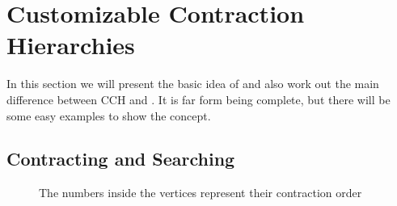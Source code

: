 \chapter{Customizable Contraction Hierarchies}\label{sec:Preliminary_CCH}

In this section we will present the basic idea of \cite[Customization Contraction Hierarchies]{CCH} and also work out the main difference between CCH and \cite[Contraction Hierarchies]{Geisberger_2012}.
It is far form being complete, but there will be some easy examples to show the concept. 

\section{Contracting and Searching}

\begin{figure}
    \centering
    
    \caption{The numbers inside the vertices represent their contraction order}
    \label{fig:contrating_and_searching}
\end{figure}

